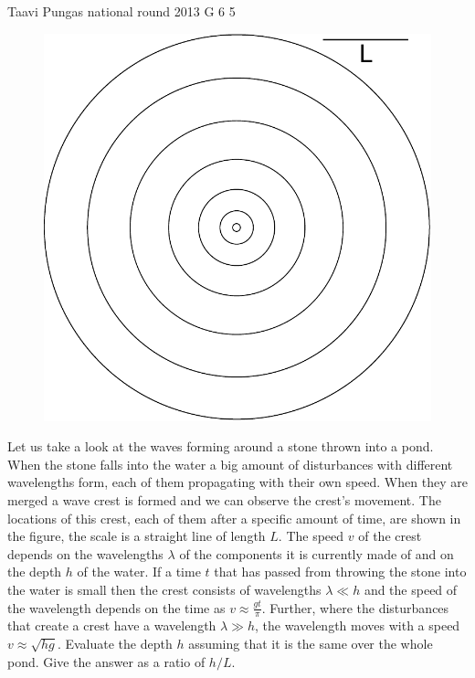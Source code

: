 \documentclass[11pt]{article}
\begin{document}
{Taavi Pungas} %
{national round} %
{2013} %
{G 6} %
{5} %
{

\ifEngStatement
\begin{figure}%
\includegraphics[width=\linewidth]{2013-v3g-06-lained}%
\end{figure}
Let us take a look at the waves forming around a stone thrown into a pond. When the stone falls into the water a big amount of disturbances with different wavelengths form, each of them propagating with their own speed. When they are merged a wave crest is formed and we can observe the crest’s movement. The locations of this crest, each of them after a specific amount of time, are shown in the figure, the scale is a straight line of length $L$. The speed $v$ of the crest depends on the wavelengths $\lambda$ of the components it is currently made of and on the depth $h$ of the water. If a time $t$ that has passed from throwing the stone into the water is small then the crest consists of wavelengths $\lambda \ll h$ and the speed of the wavelength depends on the time as $v \approx \frac{gt}{\pi}$. Further, where the disturbances that create a crest have a wavelength $\lambda \gg h$, the wavelength moves with a speed $v
\approx \sqrt{hg}$. Evaluate the depth $h$ assuming that it is the same over the whole pond. Give the answer as a ratio of $h/L$.
\fi
}
\end{document}
